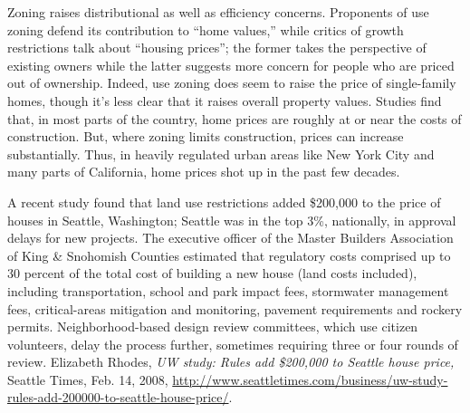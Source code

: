 Zoning raises distributional as well as efficiency concerns. Proponents of use
zoning defend its contribution to ``home values,'' while critics of growth
restrictions talk about ``housing prices''; the former takes the perspective of
existing owners while the latter suggests more concern for people who are priced
out of ownership. Indeed, use zoning does seem to raise the price of
single-family homes, though it's less clear that it raises overall property
values. Studies find that, in most parts of the country, home prices are roughly
at or near the costs of construction. But, where zoning limits construction,
prices can increase substantially. Thus, in heavily regulated urban areas like
New York City and many parts of California, home prices shot up in the past few
decades. 

A recent study found that land use restrictions added \$200,000 to the price of
houses in Seattle, Washington; Seattle was in the top 3\%, nationally, in
approval delays for new projects. The executive officer of the Master Builders
Association of King \& Snohomish Counties estimated that regulatory costs
comprised up to 30 percent of the total cost of building a new house (land costs
included), including transportation, school and park impact fees, stormwater
management fees, critical-areas mitigation and monitoring, pavement requirements
and rockery permits. Neighborhood-based design review committees, which use
citizen volunteers, delay the process further, sometimes requiring three or four
rounds of review. Elizabeth Rhodes, \emph{UW study: Rules add \$200,000 to
Seattle house price,} Seattle Times, Feb. 14, 2008,
\url{http://www.seattletimes.com/business/uw-study-rules-add-200000-to-seattle-house-price/}.


